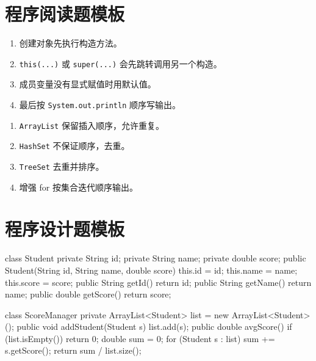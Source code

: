 \documentclass[UTF8,zihao=-4]{ctexart}
\begin{document}
\section{程序阅读题模板}

\begin{methodbox}[构造方法阅读]
\begin{enumerate}
  \item 创建对象先执行构造方法。
  \item \texttt{this(...)} 或 \texttt{super(...)} 会先跳转调用另一个构造。
  \item 成员变量没有显式赋值时用默认值。
  \item 最后按 \texttt{System.out.println} 顺序写输出。
\end{enumerate}
\end{methodbox}

\begin{methodbox}[集合输出阅读]
\begin{enumerate}
  \item \texttt{ArrayList} 保留插入顺序，允许重复。
  \item \texttt{HashSet} 不保证顺序，去重。
  \item \texttt{TreeSet} 去重并排序。
  \item 增强 for 按集合迭代顺序输出。
\end{enumerate}
\end{methodbox}

\section{程序设计题模板}

\begin{methodbox}[管理类题固定结构]
\begin{Code}
class Student {
  private String id;
  private String name;
  private double score;
  public Student(String id, String name, double score) {
    this.id = id;
    this.name = name;
    this.score = score;
  }
  public String getId() { return id; }
  public String getName() { return name; }
  public double getScore() { return score; }
}

class ScoreManager {
  private ArrayList<Student> list = new ArrayList<Student>();
  public void addStudent(Student s) { list.add(s); }
  public double avgScore() {
    if (list.isEmpty()) return 0;
    double sum = 0;
    for (Student s : list) sum += s.getScore();
    return sum / list.size();
  }
}
\end{Code}
\end{methodbox}
\end{document}
